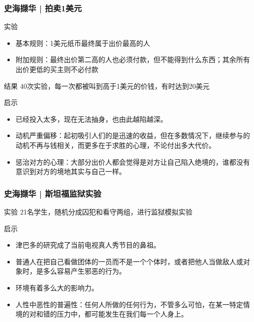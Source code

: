 \begin{frame}
  \frametitle{史海撷华 | 拍卖1美元}
  \begin{block}{实验}
    \begin{itemize}
      \item 基本规则：1美元纸币最终属于出价最高的人
      \item 附加规则：最终出价第二高的人也必须付款，但不能得到什么东西；其余所有出价更低的买主则不必付款
    \end{itemize}
  \end{block}
  \pause
  \begin{block}{结果}
    40次实验，每一次都被叫到高于1美元的价钱，有时达到20美元
  \end{block}
  \pause
  \begin{block}{启示}
    \begin{itemize}
      \item 已经投入太多，现在无法抽身，也由此越陷越深。
      \item 动机严重偏移：起初吸引人们的是迅速的收益，但在多数情况下，继续参与的动机不再与钱相关，而更多在于求胜的心理，不论付出多大代价。
      \item 惩治对方的心理：大部分出价人都会觉得是对方让自己陷入绝境的，谁都没有意识到对方的境地其实与自己一样。
    \end{itemize}
  \end{block}
\end{frame}

\begin{frame}
  \frametitle{史海撷华 | 斯坦福监狱实验}
  \begin{block}{实验}
    21名学生，随机分成囚犯和看守两组，进行监狱模拟实验
  \end{block}
  \pause
  \begin{block}{启示}
    \begin{itemize}
      \item 津巴多的研究成了当前电视真人秀节目的鼻祖。
      \item 普通人在把自己看做团体的一员而不是一个个体时，或者把他人当做敌人或对象时，是多么容易产生邪恶的行为。
      \item 环境有着多么大的影响力。
      \item 人性中恶性的普遍性：任何人所做的任何行为，不管多么可怕，在某一特定情境的对和错的压力中，都可能发生在我们每一个人身上。
    \end{itemize}
  \end{block}
\end{frame}


